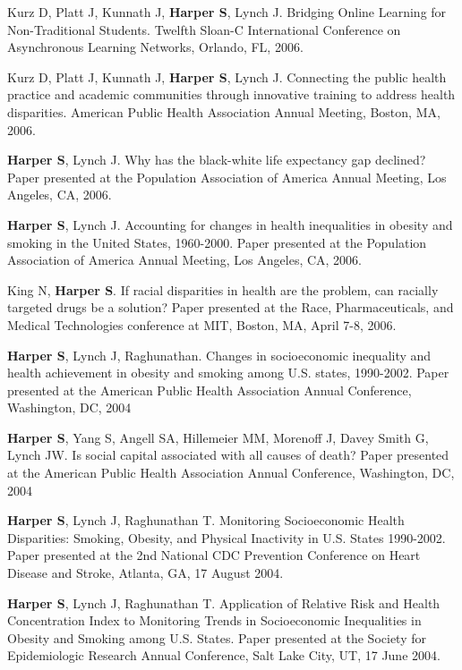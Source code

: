 \documentclass[
  letterpaper,
  DIV=11,
  numbers=noendperiod]{scrartcl}
\begin{document}
\begin{etaremune}
\item   Kurz D, Platt J, Kunnath J, \textbf{Harper S}, Lynch J. Bridging Online Learning for Non-Traditional Students.  Twelfth Sloan-C International Conference on Asynchronous Learning Networks, Orlando, FL, 2006.

\item   Kurz D, Platt J, Kunnath J, \textbf{Harper S}, Lynch J. Connecting the public health practice and academic communities through innovative training to address health disparities.  American Public Health Association Annual Meeting, Boston, MA, 2006.

\item   \textbf{Harper S}, Lynch J.  Why has the black-white life expectancy gap declined?  Paper presented at the Population Association of America Annual Meeting, Los Angeles, CA, 2006.

\item   \textbf{Harper S}, Lynch J.  Accounting for changes in health inequalities in obesity and smoking in the United States, 1960-2000.  Paper presented at the Population Association of America Annual Meeting, Los Angeles, CA, 2006.

\item   King N, \textbf{Harper S}.  If racial disparities in health are the problem, can racially targeted drugs be a solution?  Paper presented at the Race, Pharmaceuticals, and Medical Technologies conference at MIT, Boston, MA, April 7-8, 2006.

\item   \textbf{Harper S}, Lynch J, Raghunathan.  Changes in socioeconomic inequality and health achievement in obesity and smoking among U.S. states, 1990-2002.  Paper presented at the American Public Health Association Annual Conference, Washington, DC, 2004

\item   \textbf{Harper S}, Yang S, Angell SA, Hillemeier MM, Morenoff J,  Davey Smith G, Lynch JW.  Is social capital associated with all causes of death?  Paper presented at the American Public Health Association Annual Conference, Washington, DC, 2004

\item \textbf{Harper S}, Lynch J, Raghunathan T.  Monitoring Socioeconomic Health Disparities: Smoking, Obesity, and Physical Inactivity in U.S. States 1990-2002. Paper presented at the 2nd National CDC Prevention Conference on Heart Disease and Stroke, Atlanta, GA, 17 August 2004.

\item   \textbf{Harper S}, Lynch J, Raghunathan T.  Application of Relative Risk and Health Concentration Index to Monitoring Trends in Socioeconomic Inequalities in Obesity and Smoking among U.S. States. Paper presented at the Society for Epidemiologic Research Annual Conference, Salt Lake City, UT, 17 June 2004.


\end{etaremune}
\end{document}
